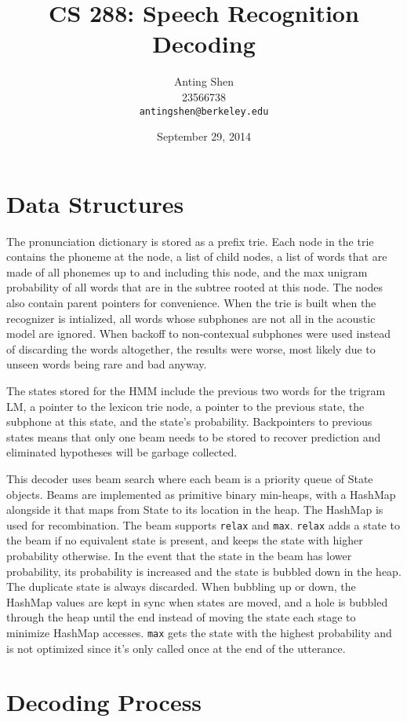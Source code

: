 \documentclass[11pt]{article}
\title{CS 288: Speech Recognition Decoding}
\author{Anting Shen \\
  23566738 \\
  {\tt antingshen@berkeley.edu} \\
}
\date{September 29, 2014}
\begin{document}
\maketitle

\section{Data Structures}
The pronunciation dictionary is stored as a prefix trie. Each node in the trie contains the phoneme at the node, a list of child nodes, a list of words that are made of all phonemes up to and including this node, and the max unigram probability of all words that are in the subtree rooted at this node. The nodes also contain parent pointers for convenience. When the trie is built when the recognizer is intialized, all words whose subphones are not all in the acoustic model are ignored. When backoff to non-contexual subphones were used instead of discarding the words altogether, the results were worse, most likely due to unseen words being rare and bad anyway.

The states stored for the HMM include the previous two words for the trigram LM, a pointer to the lexicon trie node, a pointer to the previous state, the subphone at this state, and the state's probability. Backpointers to previous states means that only one beam needs to be stored to recover prediction and eliminated hypotheses will be garbage collected. 

This decoder uses beam search where each beam is a priority queue of State objects. Beams are implemented as primitive binary min-heaps, with a HashMap alongside it that maps from State to its location in the heap. The HashMap is used for recombination. The beam supports \texttt{relax} and \texttt{max}. \texttt{relax} adds a state to the beam if no equivalent state is present, and keeps the state with higher probability otherwise. In the event that the state in the beam has lower probability, its probability is increased and the state is bubbled down in the heap. The duplicate state is always discarded. When bubbling up or down, the HashMap values are kept in sync when states are moved, and a hole is bubbled through the heap until the end instead of moving the state each stage to minimize HashMap accesses. \texttt{max} gets the state with the highest probability and is not optimized since it's only called once at the end of the utterance. 

\section{Decoding Process}
\end{document}
